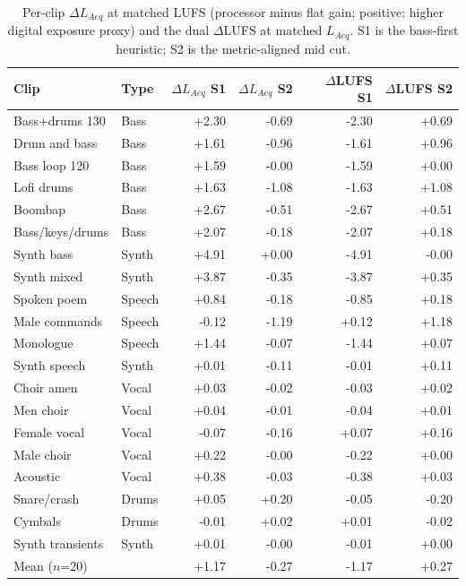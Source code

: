 \begin{table}[!htbp]
\centering
\caption{Per-clip $\Delta L_{Aeq}$ at matched LUFS (processor minus flat gain; positive: higher digital exposure proxy) and the dual $\Delta$LUFS at matched $L_{Aeq}$. S1 is the bass-first heuristic; S2 is the metric-aligned mid cut.}
\label{tab:perclip}
\renewcommand{\arraystretch}{1.08}
\begin{tabular}{l l r r r r}
\hline
Clip & Type & $\Delta L_{Aeq}$ S1 & $\Delta L_{Aeq}$ S2 & $\Delta$LUFS S1 & $\Delta$LUFS S2 \\
\hline
Bass+drums 130 & Bass & +2.30 & -0.69 & -2.30 & +0.69 \\
Drum and bass & Bass & +1.61 & -0.96 & -1.61 & +0.96 \\
Bass loop 120 & Bass & +1.59 & -0.00 & -1.59 & +0.00 \\
Lofi drums & Bass & +1.63 & -1.08 & -1.63 & +1.08 \\
Boombap & Bass & +2.67 & -0.51 & -2.67 & +0.51 \\
Bass/keys/drums & Bass & +2.07 & -0.18 & -2.07 & +0.18 \\
Synth bass & Synth & +4.91 & +0.00 & -4.91 & -0.00 \\
Synth mixed & Synth & +3.87 & -0.35 & -3.87 & +0.35 \\
Spoken poem & Speech & +0.84 & -0.18 & -0.85 & +0.18 \\
Male commands & Speech & -0.12 & -1.19 & +0.12 & +1.18 \\
Monologue & Speech & +1.44 & -0.07 & -1.44 & +0.07 \\
Synth speech & Synth & +0.01 & -0.11 & -0.01 & +0.11 \\
Choir amen & Vocal & +0.03 & -0.02 & -0.03 & +0.02 \\
Men choir & Vocal & +0.04 & -0.01 & -0.04 & +0.01 \\
Female vocal & Vocal & -0.07 & -0.16 & +0.07 & +0.16 \\
Male choir & Vocal & +0.22 & -0.00 & -0.22 & +0.00 \\
Acoustic & Vocal & +0.38 & -0.03 & -0.38 & +0.03 \\
Snare/crash & Drums & +0.05 & +0.20 & -0.05 & -0.20 \\
Cymbals & Drums & -0.01 & +0.02 & +0.01 & -0.02 \\
Synth transients & Synth & +0.01 & -0.00 & -0.01 & +0.00 \\
\hline
Mean ($n$=20) &  & +1.17 & -0.27 & -1.17 & +0.27 \\
\hline
\end{tabular}
\end{table}
